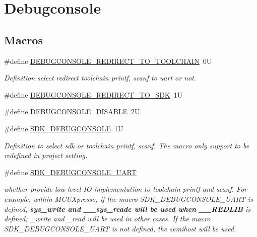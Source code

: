 \hypertarget{group__debugconsole}{}\section{Debugconsole}
\label{group__debugconsole}
\subsection*{Macros}
\begin{DoxyCompactItemize}
\item 
\#define \mbox{\hyperlink{group__debugconsole_gabb8f0adbec02f143b4f84d2eb42126df}{D\+E\+B\+U\+G\+C\+O\+N\+S\+O\+L\+E\+\_\+\+R\+E\+D\+I\+R\+E\+C\+T\+\_\+\+T\+O\+\_\+\+T\+O\+O\+L\+C\+H\+A\+IN}}~0U
\begin{DoxyCompactList}\small\item\em Definition select redirect toolchain printf, scanf to uart or not. \end{DoxyCompactList}\item 
\#define \mbox{\hyperlink{group__debugconsole_gac33031f28afa29dc8fe1718bbc86ee23}{D\+E\+B\+U\+G\+C\+O\+N\+S\+O\+L\+E\+\_\+\+R\+E\+D\+I\+R\+E\+C\+T\+\_\+\+T\+O\+\_\+\+S\+DK}}~1U
\item 
\#define \mbox{\hyperlink{group__debugconsole_gaf8f85fd102e4aedcee3d061dc2d3e0c2}{D\+E\+B\+U\+G\+C\+O\+N\+S\+O\+L\+E\+\_\+\+D\+I\+S\+A\+B\+LE}}~2U
\item 
\mbox{\label{group__debugconsole_ga7fdd594efdc8374ecd8684ed758d6cec}} 
\#define \mbox{\hyperlink{group__debugconsole_ga7fdd594efdc8374ecd8684ed758d6cec}{S\+D\+K\+\_\+\+D\+E\+B\+U\+G\+C\+O\+N\+S\+O\+LE}}~1U
\begin{DoxyCompactList}\small\item\em Definition to select sdk or toolchain printf, scanf. The macro only support to be redefined in project setting. \end{DoxyCompactList}\item 
\mbox{\label{group__debugconsole_gae225e7555c0f73bb3b705a22fe8b71e4}} 
\#define \mbox{\hyperlink{group__debugconsole_gae225e7555c0f73bb3b705a22fe8b71e4}{S\+D\+K\+\_\+\+D\+E\+B\+U\+G\+C\+O\+N\+S\+O\+L\+E\+\_\+\+U\+A\+RT}}
\begin{DoxyCompactList}\small\item\em whether provide low level IO implementation to toolchain printf and scanf. For example, within M\+C\+U\+Xpresso, if the macro S\+D\+K\+\_\+\+D\+E\+B\+U\+G\+C\+O\+N\+S\+O\+L\+E\+\_\+\+U\+A\+RT is defined, {\bfseries{sys\+\_\+write and \+\_\+\+\_\+sys\+\_\+readc will be used when \+\_\+\+\_\+\+R\+E\+D\+L\+IB}} is defined; \+\_\+write and \+\_\+read will be used in other cases. If the macro S\+D\+K\+\_\+\+D\+E\+B\+U\+G\+C\+O\+N\+S\+O\+L\+E\+\_\+\+U\+A\+RT is not defined, the semihost will be used. \end{DoxyCompactList}\item 

\end{DoxyCompactItemize}
